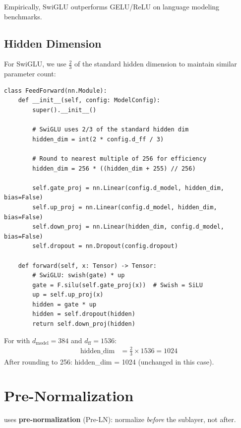 Empirically, SwiGLU outperforms GELU/ReLU on language modeling benchmarks.

\subsection{Hidden Dimension}

For SwiGLU, we use $\frac{2}{3}$ of the standard hidden dimension to maintain similar parameter count:

\begin{lstlisting}[style=python, caption={FFN with SwiGLU from model.py}]
class FeedForward(nn.Module):
    def __init__(self, config: ModelConfig):
        super().__init__()

        # SwiGLU uses 2/3 of the standard hidden dim
        hidden_dim = int(2 * config.d_ff / 3)

        # Round to nearest multiple of 256 for efficiency
        hidden_dim = 256 * ((hidden_dim + 255) // 256)

        self.gate_proj = nn.Linear(config.d_model, hidden_dim, bias=False)
        self.up_proj = nn.Linear(config.d_model, hidden_dim, bias=False)
        self.down_proj = nn.Linear(hidden_dim, config.d_model, bias=False)
        self.dropout = nn.Dropout(config.dropout)

    def forward(self, x: Tensor) -> Tensor:
        # SwiGLU: swish(gate) * up
        gate = F.silu(self.gate_proj(x))  # Swish = SiLU
        up = self.up_proj(x)
        hidden = gate * up
        hidden = self.dropout(hidden)
        return self.down_proj(hidden)
\end{lstlisting}

\begin{keypoint}
For \TryLM with $d_{\text{model}} = 384$ and $d_{\text{ff}} = 1536$:
\begin{align*}
\text{hidden\_dim} &= \frac{2}{3} \times 1536 = 1024
\end{align*}
After rounding to 256: hidden\_dim = 1024 (unchanged in this case).
\end{keypoint}

\section{Pre-Normalization}

\TryLM uses \textbf{pre-normalization} (Pre-LN): normalize \textit{before} the sublayer, not after.

